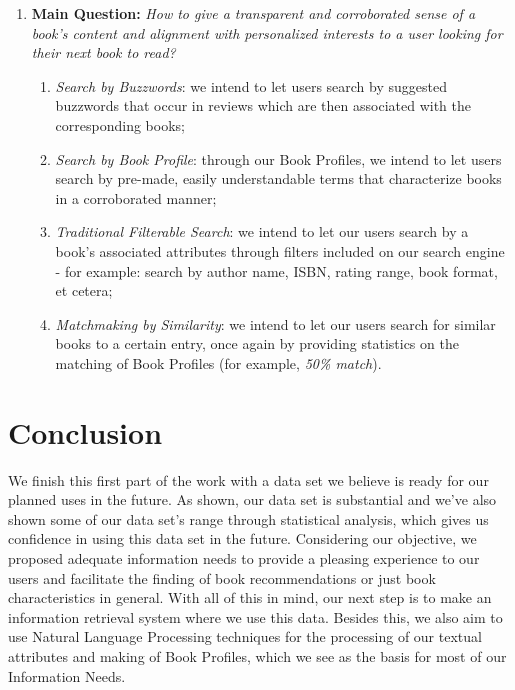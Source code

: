 \documentclass[conference]{IEEEtran}
\begin{document}
    \begin{enumerate}
        \item \textbf{Main Question:} \textit{How to give a transparent and corroborated sense of a book's content and alignment with personalized interests to a user looking for their next book to read?}
    \begin{enumerate}
        \item \textit{Search by Buzzwords}: we intend to let users search by suggested buzzwords that occur in reviews which are then associated with the corresponding books; 
        \item \textit{Search by Book Profile}: through our Book Profiles, we intend to let users search by pre-made, easily understandable terms that characterize books in a corroborated manner;
        \item \textit{Traditional Filterable Search}: we intend to let our users search by a book's associated attributes through filters included on our search engine - for example: search by author name, ISBN, rating range, book format, et cetera;
        \item \textit{Matchmaking by Similarity}: we intend to let our users search for similar books to a certain entry, once again by providing statistics on the matching of Book Profiles (for example, \textit{50\% match}).
    \end{enumerate}
\end{enumerate}

\section{Conclusion}
We finish this first part of the work with a data set we believe is ready for our planned uses in the future. As shown, our data set is substantial and we've also shown some of our data set's range through statistical analysis, which gives us confidence in using this data set in the future. \newline
Considering our objective, we proposed adequate information needs to provide a pleasing experience to our users and facilitate the finding of book recommendations or just book characteristics in general. \newline
With all of this in mind, our next step is to make an information retrieval system where we use this data. Besides this, we also aim to use Natural Language Processing techniques for the processing of our textual attributes and making of Book Profiles, which we see as the basis for most of our Information Needs.




\end{document}
